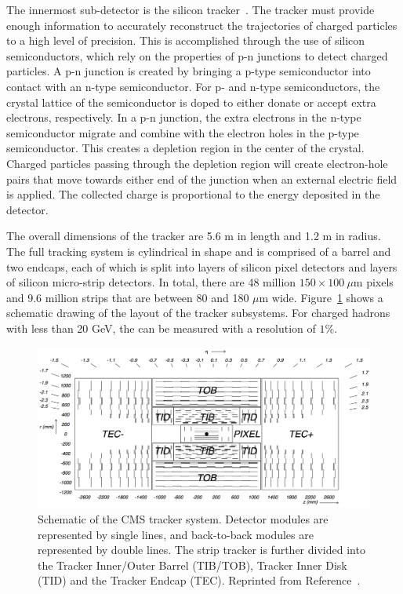 The innermost sub-detector is the silicon tracker~\cite{trackerTDR,trackerTDRAddendum}. The tracker must provide enough information to accurately reconstruct the trajectories of charged particles to a high level of precision. This is accomplished through the use of silicon semiconductors, which rely on the properties of p-n junctions to detect charged particles. A p-n junction is created by bringing a p-type semiconductor into contact with an n-type semiconductor. For p- and n-type semiconductors, the crystal lattice of the semiconductor is doped to either donate or accept extra electrons, respectively. In a p-n junction, the extra electrons in the n-type semiconductor migrate and combine with the electron holes in the p-type semiconductor. This creates a depletion region in the center of the crystal. Charged particles passing through the depletion region will create electron-hole pairs that move towards either end of the junction when an external electric field is applied. The collected charge is proportional to the energy deposited in the detector.

The overall dimensions of the tracker are 5.6 m in length and 1.2 m in radius. The full tracking system is cylindrical in shape and is comprised of a barrel and two endcaps, each of which is split into layers of silicon pixel detectors and layers of silicon micro-strip detectors. In total, there are 48 million $150\times100~\mu$m pixels and 9.6 million strips that are between 80 and 180 $\mu$m wide. Figure~\ref{fig:TrackerLayout} shows a schematic drawing of the layout of the tracker subsystems. For charged hadrons with \pt less than 20 GeV, the \pt can be measured with a resolution of $1\%$. 

\begin{figure}[h!]
	\centering
	\includegraphics[width=\linewidth]{Figures/Detector/tracker_layout.png}
       \caption[Schematic of the CMS tracker system.]{Schematic of the CMS tracker system. Detector modules are represented by single lines, and back-to-back modules are represented by double lines. The strip tracker is further divided into the Tracker Inner/Outer Barrel (TIB/TOB), Tracker Inner Disk (TID) and the Tracker Endcap (TEC). Reprinted from Reference~\cite{Chatrchyan2008zzk}.}
   	\label{fig:TrackerLayout}
\end{figure}

